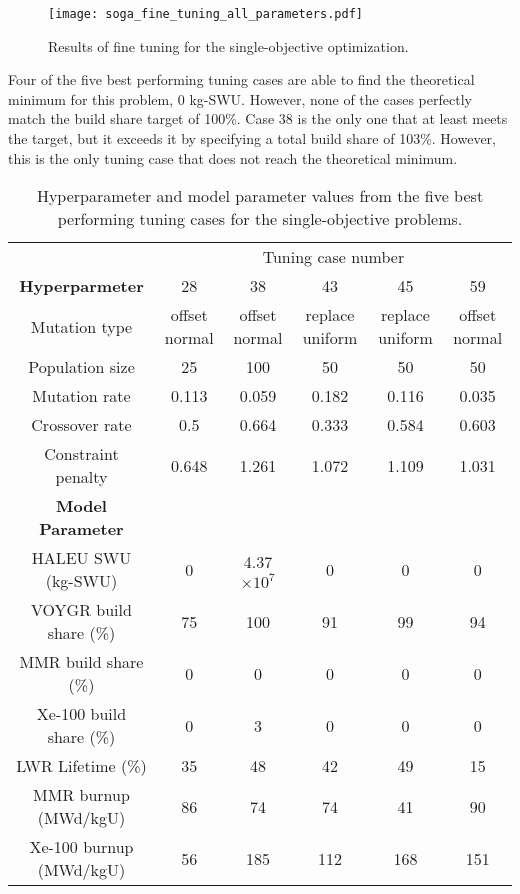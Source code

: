 \begin{figure}[h!]
    \texttt{[image: soga\_fine\_tuning\_all\_parameters.pdf]}
    \caption{Results of fine tuning for the single-objective 
    optimization.}
    \label{fig:soga_fine_tuning}
\end{figure}

Four of the five best performing tuning cases are able to find the 
theoretical minimum for this problem, 0 kg-SWU. However, none of the 
cases perfectly match the build share target of 100\%. Case 38 is the only 
one that at least meets the target, but it exceeds it by specifying a total 
build share of 103\%. However, this is the only tuning case that does 
not reach the theoretical minimum. 

\begin{table}[h!]
    \centering 
    \caption{Hyperparameter and model parameter values from the five best 
    performing tuning cases for the single-objective problems.}
    \label{tab:soga_tuning_results}
    \begin{tabular}{c c c c c c}
        \hline 
        & \multicolumn{5}{c}{Tuning case number} \\
        \textbf{Hyperparmeter} & 28 & 38 & 43 & 45 & 59 \\
        \hline 
        Mutation type & offset normal & offset normal & replace uniform &
        replace uniform & offset normal\\
        Population size & 25 & 100 & 50 & 50 & 50 \\
        Mutation rate & 0.113 & 0.059 & 0.182 & 0.116 & 0.035\\
        Crossover rate & 0.5 & 0.664 & 0.333 & 0.584 & 0.603\\
        Constraint penalty & 0.648 & 1.261 & 1.072 & 1.109 & 1.031\\
        \hline
        \textbf{Model Parameter} \\
        \gls{HALEU} \gls{SWU} (kg-SWU)& 0 & 4.37 $\times 10^7$ & 0 & 0 & 0\\
        VOYGR build share (\%) & 75 & 100 & 91 & 99 & 94\\
        \gls{MMR} build share (\%)& 0 & 0 & 0 & 0 & 0\\
        Xe-100 build share (\%) & 0 & 3 & 0 & 0 & 0\\
        LWR Lifetime (\%)& 35 & 48 & 42 & 49 & 15\\
        \gls{MMR} burnup (MWd/kgU) & 86 & 74 & 74 & 41 & 90\\
        Xe-100 burnup (MWd/kgU) & 56 & 185 & 112 & 168 & 151\\
        \hline 
        
        
    \end{tabular}
\end{table}

